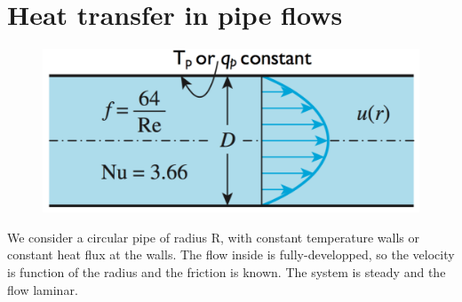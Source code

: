 \section{Heat transfer in pipe flows}
	\begin{figure}
	\vspace{-5mm}
	\includegraphics[scale=0.3]{ch5/6}
	\end{figure}			
	We consider a circular pipe of radius R, with constant temperature walls or constant heat flux at the walls. The flow inside is fully-developped, so the velocity is function of the radius and the friction is known. The system is steady and the flow laminar. 
